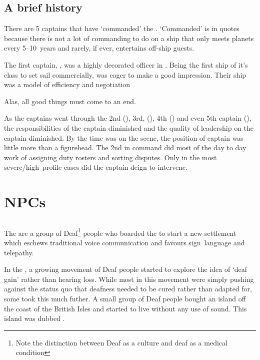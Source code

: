 \documentclass[a4paper,twocolumn]{memoir}
\begin{document}
\section{A brief history}
\label{sec:brief-history}

There are 5 captains that have `commanded' the \aventis. `Commanded' is in quotes because there is not a lot of commanding to do on a ship that only meets planets every 5--10~years and rarely, if ever, entertains off-ship guests.

The first captain, \captainone, was a highly decorated officer in \thecompany. Being the first ship of it's class to set sail commercially, \captainone was eager to make a good impression. Their ship was a model of efficiency and negotiation

Alas, all good things must come to an end.

As the captains went through the 2nd (\captaintwo), 3rd, (\captainthree), 4th (\captainfour) and even 5th captain (\captainfive), the responsibilities of the captain diminished and the quality of leadership on the captain diminished. By the time \captainfive was on the scene, the position of captain was little more than a figurehead. The 2nd in command did most of the day to day work of assigning duty rosters and sorting disputes. Only in the most severe/high~profile cases did the captain deign to intervene.



\chapter{NPCs}

\section{\deafies}
\label{sec:teledeafs}

The \deafies are a group of Deaf\footnote{Note the distinction between Deaf as a
  culture and deaf as a medical condition} people who boarded the \aventis to
start a new settlement which eschews traditional voice communication and favours
sign~language and telepathy.

In the , a growing movement of Deaf people started to explore the
idea of `deaf gain' rather than hearing loss. While most in this movement were
simply pushing against the status quo that deafness needed to be cured rather
than adapted for, some took this much futher. A small group of Deaf people
bought an island off the coast of the British Isles and started to live without
any use of sound. This island was dubbed \deafisland.
\end{document}
